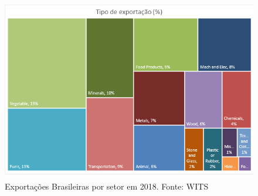 \begin{figure}[h]
    \centering
    \includegraphics[scale=0.75]{Imagens/exportacoes.png}
    \caption{Exportações Brasileiras por setor em 2018. Fonte: WITS}
\end{figure}